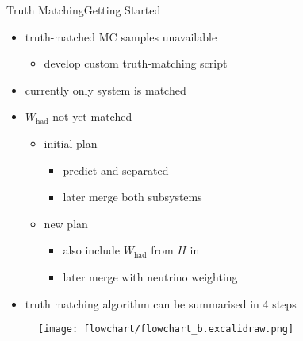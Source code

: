 \documentclass[9pt, aspectratio=169]{beamer}
\begin{document}
\begin{frame}{Truth Matching}{Getting Started}
	\begin{minipage}{.75\textwidth}
		\begin{itemize}
			\item truth-matched MC samples unavailable 
			\begin{itemize}
				\item develop custom truth-matching script
			\end{itemize}
			\item currently only \ttbar system is matched 
			\item $W_\text{had}$ not yet matched
			\begin{itemize}
				\item initial plan
				\begin{itemize}
					\item predict \ttbar and \HWW separated
					\item later merge both subsystems
				\end{itemize}
				\item new plan
				\begin{itemize}
					\item also include $W_\text{had}$ from $H$ in \spanet
					\item later merge \spanet with neutrino weighting
				\end{itemize}  
			\end{itemize}
			\item truth matching algorithm can be summarised in 4 steps
		\end{itemize}
	\end{minipage}\hfill
	\begin{minipage}{.2\textwidth}
		\begin{figure}
			\centering
			\texttt{[image: flowchart/flowchart\_b.excalidraw.png]}
		\end{figure}
	\end{minipage}
\end{frame}
\end{document}

